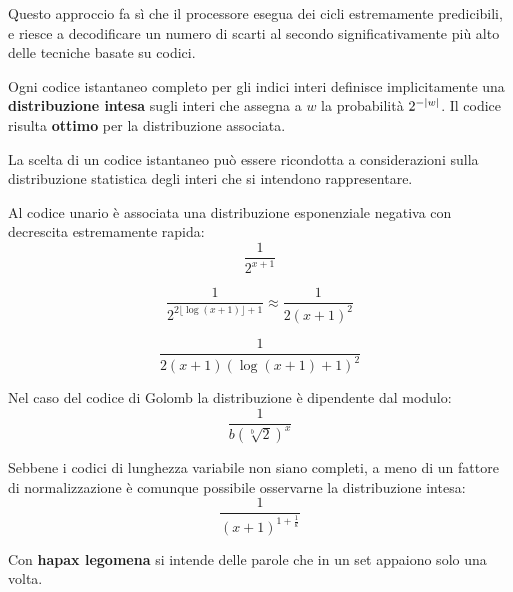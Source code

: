 \documentclass[\main/main.tex]{subfiles}
\begin{document}
\begin{multicols}{2}
\begin{definition}
    Questo approccio fa sì che il processore esegua dei cicli estremamente predicibili, e riesce a decodificare un numero di scarti al secondo significativamente più alto delle tecniche basate su codici.
\end{definition}
\begin{definition}
    Ogni codice istantaneo completo per gli indici interi definisce implicitamente una \textbf{distribuzione intesa} sugli interi che assegna a \(w\) la probabilità \(2^{-\left\lvert w\right\rvert}\). Il codice risulta \textbf{ottimo} per la distribuzione associata.
    
    La scelta di un codice istantaneo può essere ricondotta a considerazioni sulla distribuzione statistica degli interi che si intendono rappresentare.
\end{definition}
\begin{definition}
    Al codice unario è associata una distribuzione esponenziale negativa con decrescita estremamente rapida:
    \[
        \frac{1}{2^{x+1}}
    \]
\end{definition}
\begin{definition}
    \[
        \frac{1}{2^{2\lfloor\log (x+1)\rfloor+ 1}} \approx \frac{1}{2(x+1)^{2}}
    \]
\end{definition}
\begin{definition}
    \[
        \frac{1}{2(x+1)(\log (x+1)+1)^{2}}
    \]
\end{definition}
\begin{definition}
    Nel caso del codice di Golomb la distribuzione è dipendente dal modulo:
    \[
        \frac{1}{b(\sqrt[b]{2})^{x}}
    \]
\end{definition}
\begin{definition}
    Sebbene i codici di lunghezza variabile non siano completi, a meno di un fattore di normalizzazione è comunque possibile osservarne la distribuzione intesa:
    \[
        \frac{1}{(x+1)^{1+\frac{1}{k}}}
    \]
\end{definition}
\begin{definition}
    Con \textbf{hapax legomena} si intende delle parole che in un set appaiono solo una volta.
\end{definition}
\begin{observation}

\end{observation}
\end{multicols}
\end{document}
